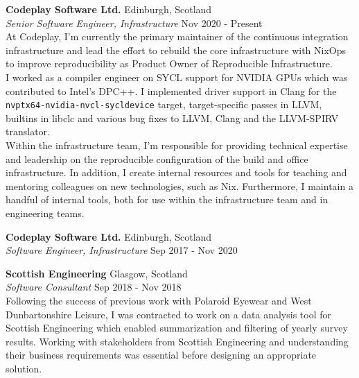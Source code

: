 \documentclass[a4paper]{article}
\begin{document}
\textbf{Codeplay Software Ltd.} \hfill {\color{gray} Edinburgh, Scotland} \\
\textit{Senior Software Engineer, Infrastructure} \hfill {\color{gray} Nov 2020 - Present} \\
\vspace{2mm}
At Codeplay, I'm currently the primary maintainer of the continuous integration infrastructure and
lead the effort to rebuild the core infrastructure with NixOps to improve reproducibility as Product
Owner of Reproducible Infrastructure. \\
\vspace{2mm}
I worked as a compiler engineer on SYCL support for NVIDIA GPUs which was contributed to Intel's
DPC++. I implemented driver support in Clang for the \verb|nvptx64-nvidia-nvcl-sycldevice| target,
target-specific passes in LLVM, builtins in libclc and various bug fixes to LLVM, Clang and the
LLVM-SPIRV translator. \\
\vspace{2mm}
Within the infrastructure team, I'm responsible for providing technical expertise and leadership on
the reproducible configuration of the build and office infrastructure. In addition, I create
internal resources and tools for teaching and mentoring colleagues on new technologies, such as Nix.
Furthermore, I maintain a handful of internal tools, both for use within the infrastructure
team and in engineering teams. \\
\vspace{2mm}

\textbf{Codeplay Software Ltd.} \hfill {\color{gray} Edinburgh, Scotland} \\
\textit{Software Engineer, Infrastructure} \hfill {\color{gray} Sep 2017 - Nov 2020} \\
\vspace{2mm}

\textbf{Scottish Engineering} \hfill {\color{gray} Glasgow, Scotland} \\
\textit{Software Consultant} \hfill {\color{gray} Sep 2018 - Nov 2018} \\
\vspace{2mm}
Following the success of previous work with Polaroid Eyewear and West Dunbartonshire Leisure, I
was contracted to work on a data analysis tool for Scottish Engineering which enabled summarization
and filtering of yearly survey results. Working with stakeholders from Scottish Engineering and
understanding their business requirements was essential before designing an appropriate solution.
\vspace{2mm}
\end{document}
